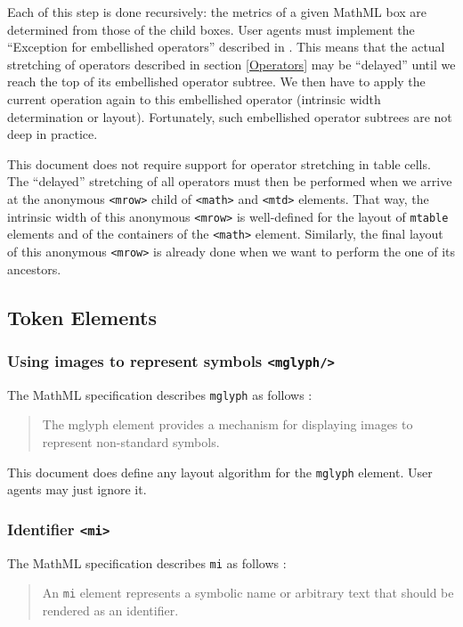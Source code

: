 Each of this step is done recursively: the metrics of a given MathML box
are determined from those of the child boxes. User agents must implement
the ``Exception for embellished operators'' described in \cite{MathML3}.
This means that the actual stretching of operators described in section
\ref{Operators} may be ``delayed'' until we reach the top of its embellished
operator subtree. We then have to apply the current operation again
to this embellished operator (intrinsic width determination or layout).
Fortunately, such embellished operator subtrees are not deep in practice.

This document does not require support for operator stretching in table cells.
The ``delayed'' stretching of all operators must then be performed when we
arrive at the anonymous {\tt <mrow>} child of {\tt <math>} and {\tt <mtd>}
elements.
That way, the intrinsic width of this anonymous {\tt <mrow>} is well-defined
for the layout of {\tt mtable} elements and of the containers of the
{\tt <math>} element. Similarly, the final layout of this anonymous
{\tt <mrow>} is already done when we want to perform the one of its ancestors.

\subsection{Token Elements}

\subsubsection{Using images to represent symbols {\tt <mglyph/>}}

The MathML specification describes {\tt mglyph} as follows \cite{MathML3}:
%
\begin{quote}
The mglyph element provides a mechanism for displaying images to represent
non-standard symbols.
\end{quote}

This document does define any layout algorithm for the {\tt mglyph}
element. User agents may just ignore it.

\subsubsection{Identifier {\tt <mi>}}\label{Identifier}

The MathML specification describes {\tt mi} as follows \cite{MathML3}:
%
\begin{quote}
  An {\tt mi} element represents a symbolic name or arbitrary text that should
  be rendered as an identifier.
\end{quote}

